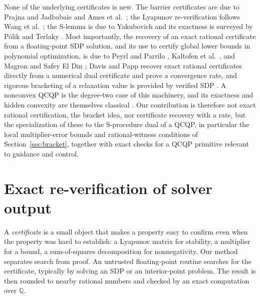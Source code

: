\documentclass[11pt]{article}
\newcommand{\Q}{\mathbb{Q}}
\theoremstyle{plain}
\theoremstyle{remark}
\begin{document}
None of the underlying certificates is new. The barrier certificates are due to
Prajna and Jadbabaie \cite{prajna2004} and Ames et al.\ \cite{ames2017}; the
Lyapunov re-verification follows Wang et al.\ \cite{feron2013}; the S-lemma is
due to Yakubovich \cite{yakubovich1971} and its exactness is surveyed by P\'olik
and Terlaky \cite{polik2007}. Most importantly, the recovery of an exact rational
certificate from a floating-point SDP solution, and its use to certify global
lower bounds in polynomial optimization, is due to Peyrl and Parrilo
\cite{peyrl2008}, Kaltofen et al.\ \cite{kaltofen2012}, and Magron and Safey El
Din \cite{magron2018}; Davis and Papp \cite{davis2022} recover exact rational
certificates directly from a numerical dual certificate and prove a convergence
rate, and rigorous bracketing of a relaxation value is provided by verified SDP
\cite{jansson2009,roux2018}. A nonconvex QCQP is the degree-two case of this
machinery, and its exactness and hidden convexity are themselves classical
\cite{bental1996,beck2006,polik2007}. Our contribution is therefore not exact
rational certification, the bracket idea, nor certificate recovery with a rate,
but the specialization of these to the S-procedure dual of a QCQP, in particular
the local multiplier-error bounds and rational-witness conditions of
Section~\ref{sec:bracket}, together with exact checks for a QCQP primitive
relevant to guidance and control.

\section{Exact re-verification of solver output}
\label{sec:discipline}

A \emph{certificate} is a small object that makes a property easy to confirm even
when the property was hard to establish: a Lyapunov matrix for stability, a
multiplier for a bound, a sum-of-squares decomposition for nonnegativity. Our
method separates search from proof. An untrusted floating-point routine searches
for the certificate, typically by solving an SDP or an interior-point problem.
The result is then rounded to nearby rational numbers and checked by an exact
computation over $\Q$.
\end{document}
